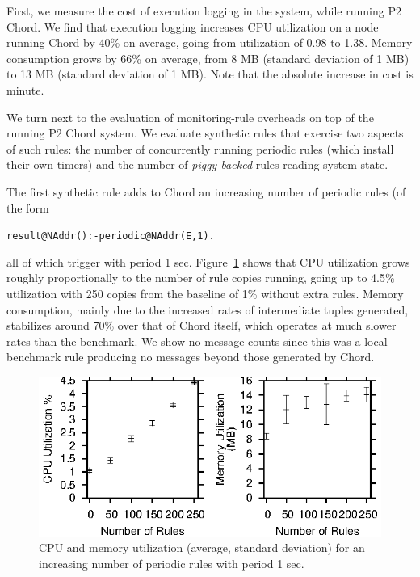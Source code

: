 \documentclass{sig-alt-full}
\newenvironment{overlog}{\begin{alltt}\footnotesize}{\end{alltt}}
\begin{document}
First, we measure the cost of execution logging in the system, while
running P2 Chord.  We find that execution logging increases CPU
utilization on a node running Chord by 40\% on average, going from
utilization of 0.98 to 1.38.  Memory consumption grows by 66\% on
average, from 8 MB (standard deviation of 1 MB) to 13 MB
(standard deviation of 1 MB). Note that the absolute increase in cost is
minute.

We turn next to the evaluation of monitoring-rule
overheads on top of the running P2 Chord system.  We evaluate synthetic
rules that exercise two aspects of such rules: the number of
concurrently running periodic
rules (which install their own timers) and the number of
\emph{piggy-backed} rules reading system state.

The first synthetic rule adds to Chord an increasing number of periodic
rules (of the form
\begin{overlog}
result@NAddr() :- periodic@NAddr(E, 1).
\end{overlog}
all of
which trigger with period 1 sec.  Figure~\ref{fig:manyPeriodics1} shows
that CPU utilization grows roughly proportionally to the number of rule
copies running, going up to 4.5\% utilization with 250 copies from the
baseline of 1\% without extra rules.  Memory consumption, mainly due to the
increased rates of intermediate tuples generated, stabilizes around 70\%
over that of Chord itself, which operates at much slower rates than the
benchmark.
We show no message counts since this was a local benchmark rule
producing no messages beyond those  generated by Chord.

\begin{figure}
\centerline{\includegraphics{newResults/manyPeriodics1}}
\caption{CPU and memory utilization (average, standard deviation) for
  an increasing number of periodic rules with period 1 sec.}
\label{fig:manyPeriodics1}
\end{figure}
\end{document}
